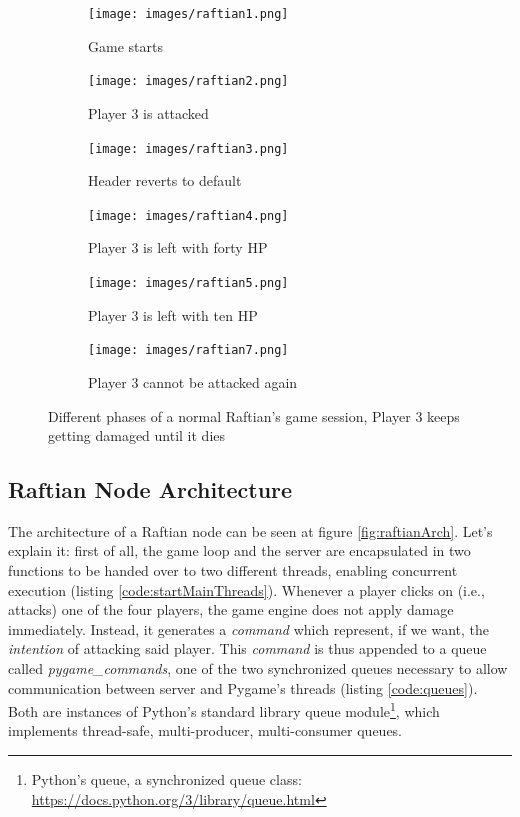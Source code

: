 \begin{figure}[h]
    \centering
    \begin{subfigure}{0.31\textwidth}
        \texttt{[image: images/raftian1.png]}
        \caption{Game starts}
    \end{subfigure}
    \hfill
    \begin{subfigure}{0.31\textwidth}
        \texttt{[image: images/raftian2.png]}
        \caption{Player 3 is attacked}
    \end{subfigure}
    \hfill
    \begin{subfigure}{0.31\textwidth}
        \texttt{[image: images/raftian3.png]}
        \caption{Header reverts to default}
    \end{subfigure}
    \hfill
    \begin{subfigure}{0.31\textwidth}
        \texttt{[image: images/raftian4.png]}
        \caption{Player 3 is left with forty HP}
    \end{subfigure}
    \hfill
    \begin{subfigure}{0.31\textwidth}
        \texttt{[image: images/raftian5.png]}
        \caption{Player 3 is left with ten HP}
    \end{subfigure}
    \hfill
    \begin{subfigure}{0.31\textwidth}
        \texttt{[image: images/raftian7.png]}
        \caption{Player 3 cannot be attacked again}
    \end{subfigure}

    \caption{Different phases of a normal Raftian's game session, Player 3 keeps getting damaged until it dies}
    \label{fig:raftianUI}
\end{figure}

\subsection{Raftian Node Architecture}

The architecture of a Raftian node can be seen at figure \ref{fig:raftianArch}. Let's explain it: first of all, the game loop and the server are encapsulated in two functions to be handed over to two different threads, enabling concurrent execution (listing \ref{code:startMainThreads}). Whenever a player clicks on (i.e., attacks) one of the four players, the game engine does not apply damage immediately. Instead, it generates a \textit{command} which represent, if we want, the \textit{intention} of attacking said player. This \textit{command} is thus appended to a queue called \textit{pygame\_commands}, one of the two synchronized queues necessary to allow communication between server and Pygame's threads (listing \ref{code:queues}). Both are instances of Python's standard library queue module\footnote{Python's queue, a synchronized queue class: \url{https://docs.python.org/3/library/queue.html}}, which implements thread-safe, multi-producer, multi-consumer queues. 

